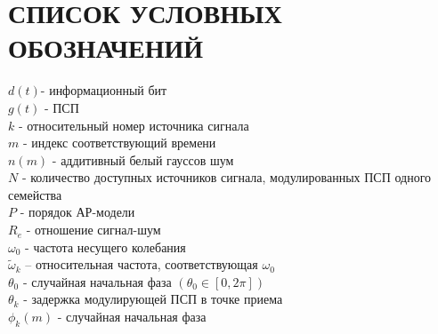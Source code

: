 \section*{СПИСОК УСЛОВНЫХ ОБОЗНАЧЕНИЙ}
\noindent
${d(t)}$- информационный бит \\
${g(t)}$ - ПСП 	\\
${k}$ - относительный номер источника сигнала	\\
${m}$ - индекс соответствующий времени	\\
${n(m)}$ - аддитивный белый гауссов шум \\
${N}$ - количество доступных источников сигнала, модулированных ПСП одного семейства \\
${P}$ - порядок АР-модели \\
${R_e}$ - отношение сигнал-шум \\

\noindent
${\omega_0}$ - частота несущего колебания \\
${\tilde{\omega}_{k}}$  – относительная частота, соответствующая ${\omega_0}$ \\
${\theta_0}$ - случайная начальная фаза ${(\theta_0 \in [0, 2\pi])}$ \\
${\theta_k}$ - задержка модулирующей ПСП в точке приема \\
${\phi_k(m)}$ - случайная начальная фаза \\

\newpage
